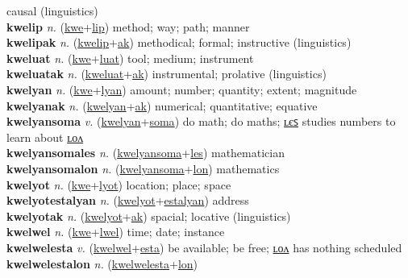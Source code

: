 causal (linguistics) \label{kwelialak} \\
\textbf{kwelip} \textit{n.} (\hyperref[kwe]{kwe}+\hyperref[lip]{lip})
method; way; path; manner \label{kwelip} \\
\textbf{kwelipak} \textit{n.} (\hyperref[kwelip]{kwelip}+\hyperref[ak]{ak})
methodical; formal; instructive (linguistics) \label{kwelipak} \\
\textbf{kweluat} \textit{n.} (\hyperref[kwe]{kwe}+\hyperref[luat]{luat})
tool; medium; instrument \label{kweluat} \\
\textbf{kweluatak} \textit{n.} (\hyperref[kweluat]{kweluat}+\hyperref[ak]{ak})
instrumental; prolative (linguistics) \label{kweluatak} \\
\textbf{kwelyan} \textit{n.} (\hyperref[kwe]{kwe}+\hyperref[lyan]{lyan})
amount; number; quantity; extent; magnitude \label{kwelyan} \\
\textbf{kwelyanak} \textit{n.} (\hyperref[kwelyan]{kwelyan}+\hyperref[ak]{ak})
numerical; quantitative; equative \label{kwelyanak} \\
\textbf{kwelyansoma} \textit{v.} (\hyperref[kwelyan]{kwelyan}+\hyperref[soma]{soma})
do math; do maths; \hyperref[kwelyansomales]{ʟєꜱ} studies numbers to learn about \hyperref[kwelyansomalon]{ʟᴏᴧ} \label{kwelyansoma} \\
\textbf{kwelyansomales} \textit{n.} (\hyperref[kwelyansoma]{kwelyansoma}+\hyperref[les]{les})
mathematician \label{kwelyansomales} \\
\textbf{kwelyansomalon} \textit{n.} (\hyperref[kwelyansoma]{kwelyansoma}+\hyperref[lon]{lon})
mathematics \label{kwelyansomalon} \\
\textbf{kwelyot} \textit{n.} (\hyperref[kwe]{kwe}+\hyperref[lyot]{lyot})
location; place; space \label{kwelyot} \\
\textbf{kwelyotestalyan} \textit{n.} (\hyperref[kwelyot]{kwelyot}+\hyperref[estalyan]{estalyan})
address \label{kwelyotestalyan} \\
\textbf{kwelyotak} \textit{n.} (\hyperref[kwelyot]{kwelyot}+\hyperref[ak]{ak})
spacial; locative (linguistics) \label{kwelyotak} \\
\textbf{kwelwel} \textit{n.} (\hyperref[kwe]{kwe}+\hyperref[lwel]{lwel})
time; date; instance \label{kwelwel} \\
\textbf{kwelwelesta} \textit{v.} (\hyperref[kwelwel]{kwelwel}+\hyperref[esta]{esta})
be available; be free; \hyperref[kwelwelestalon]{ʟᴏᴧ} has nothing scheduled \label{kwelwelesta} \\
\textbf{kwelwelestalon} \textit{n.} (\hyperref[kwelwelesta]{kwelwelesta}+\hyperref[lon]{lon})
